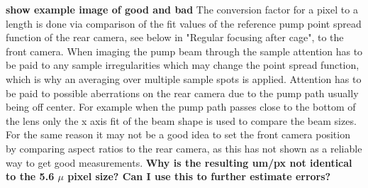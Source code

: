 \documentclass[twoside,openright]{scrreprt}
\begin{document}
\textbf{show example image of good and bad}
The conversion factor for a pixel to a length is done via comparison of the fit values of the reference pump point spread function of the rear camera, see below in "Regular focusing after cage", to the front camera. When imaging the pump beam through the sample attention has to be paid to any sample irregularities which may change the point spread function, which is why an averaging over multiple sample spots is applied. Attention has to be paid to possible aberrations on the rear camera due to the pump path usually being off center. For example when the pump path passes close to the bottom of the lens only the x axis fit of the beam shape is used to compare the beam sizes. For the same reason it may not be a good idea to set the front camera position by comparing aspect ratios to the rear camera, as this has not shown as a reliable way to get good measurements.
\textbf{Why is the resulting um/px not identical to the 5.6 $\mu$ pixel size? Can I use this to further estimate errors?}
\end{document}
